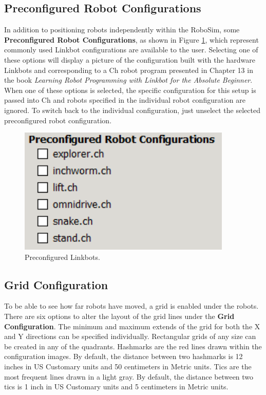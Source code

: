 \documentclass{article}
\begin{document}
\subsection{Preconfigured Robot Configurations}
In addition to positioning robots independently within the RoboSim, some {\bf
Preconfigured Robot Configurations}, as shown in Figure \ref{fig:preconfig},
which represent commonly used Linkbot configurations  are available to the user.
Selecting one of these options will display a picture of the configuration built
with the hardware Linkbots and corresponding to a Ch robot program presented in
Chapter 13 in the book {\em Learning Robot Programming with Linkbot for the
Absolute Beginner}.  When one of these options is selected, the specific
configuration for this setup is passed into Ch and robots specified in the
individual robot configuration are ignored.  To switch back to the individual
configuration, just unselect the selected preconfigured robot configuration.
\begin{figure}[H]
	\begin{center}
		\includegraphics[width=4in]{images/gui_preconfig}
	\end{center}
	\caption{Preconfigured Linkbots.}
	\label{fig:preconfig}
\end{figure}

\subsection{Grid Configuration}
To be able to see how far robots have moved, a grid is enabled under the robots.
There are six options to alter the layout of the grid lines under the {\bf Grid
Configuration}.  The minimum and maximum extends of the grid for both the X and
Y directions can be specified individually.  Rectangular grids of any size can
be created in any of the quadrants.  Hashmarks are the red lines drawn within
the configuration images.  By default, the distance between two hashmarks is 12
inches in US Customary units and 50 centimeters in Metric units.  Tics are the
most frequent lines drawn in a light gray.  By default, the distance between two
tics is 1 inch in US Customary units and 5 centimeters in Metric units.
\end{document}
